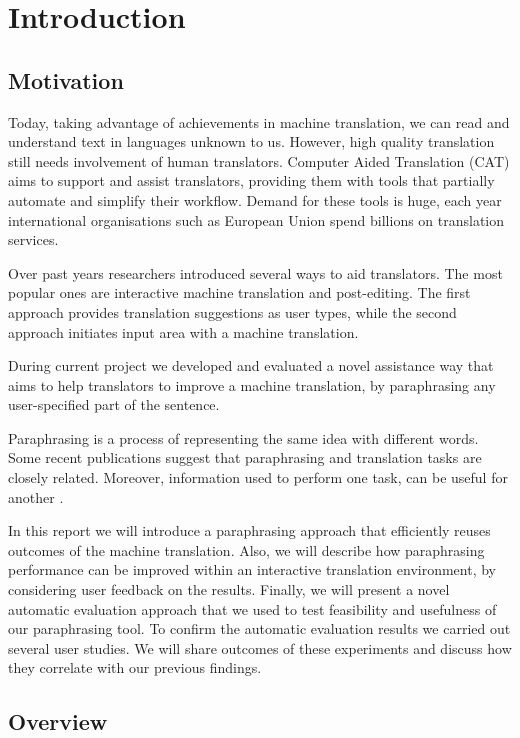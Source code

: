 \chapter{Introduction}
  
\section{Motivation}

Today, taking advantage of achievements in machine translation, we can read and understand text in languages unknown to us. However, high quality translation still needs involvement of human translators. Computer Aided Translation (CAT) aims to support and assist translators, providing them with tools that partially automate and simplify their workflow. Demand for these tools is huge, each year international organisations such as European Union spend billions on translation services. 

Over past years researchers introduced several ways to aid translators. The most popular ones are interactive machine translation and post-editing. The first approach provides translation suggestions as user types, while the second approach initiates input area with a machine translation. 

During current project we developed and evaluated a novel assistance way that aims to help translators to improve a machine translation, by paraphrasing any user-specified part of the sentence.

Paraphrasing is a process of representing the same idea with different words. Some recent publications suggest that paraphrasing and translation tasks are closely related. Moreover, information used to perform one task, can be useful for another \citep{Callison-Burch2007}. 

In this report we will introduce a paraphrasing approach that efficiently reuses outcomes of the machine translation. Also, we will describe how paraphrasing performance can be improved within an interactive translation environment, by considering user feedback on the results. Finally, we will present a novel automatic evaluation approach that we used to test feasibility and usefulness of our paraphrasing tool. To confirm the automatic evaluation results we carried out several user studies. We will share outcomes of these experiments and discuss how they correlate with our previous findings. 

\section{Overview}

